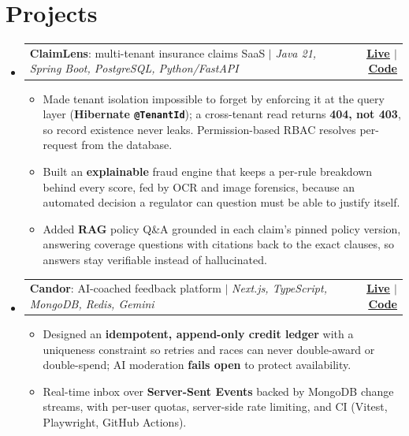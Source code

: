 \documentclass[letterpaper,11pt]{article}
\makeatletter
\newcommand{\resumeItem}[1]{
  \item\small{
    {#1 \vspace{-2pt}}
  }
}
\newcommand{\resumeProjectHeading}[2]{
    \item
    \begin{tabular*}{1.001\textwidth}{l@{\extracolsep{\fill}}r}
      \small#1 & \textbf{\small #2}\\
    \end{tabular*}\vspace{-7pt}
}
\newcommand{\resumeSubHeadingListStart}{\begin{itemize}[leftmargin=0.0in, label={}]}
\newcommand{\resumeSubHeadingListEnd}{\end{itemize}}
\newcommand{\resumeItemListStart}{\begin{itemize}}
\newcommand{\resumeItemListEnd}{\end{itemize}\vspace{-5pt}}
\makeatother
\begin{document}
\section{Projects}
    \vspace{-5pt}
    \resumeSubHeadingListStart
      \resumeProjectHeading
          {\textbf{ClaimLens}: multi-tenant insurance claims SaaS $|$ \emph{Java 21, Spring Boot, PostgreSQL, Python/FastAPI}}{\href{https://claimlens-ten.vercel.app}{\underline{Live}} $|$ \href{https://github.com/Yogesh0627/Claim-Lens}{\underline{Code}}}
          \resumeItemListStart
            \resumeItem{Made tenant isolation impossible to forget by enforcing it at the query layer (\textbf{Hibernate \texttt{@TenantId}}); a cross-tenant read returns \textbf{404, not 403}, so record existence never leaks. Permission-based RBAC resolves per-request from the database.}
            \resumeItem{Built an \textbf{explainable} fraud engine that keeps a per-rule breakdown behind every score, fed by OCR and image forensics, because an automated decision a regulator can question must be able to justify itself.}
            \resumeItem{Added \textbf{RAG} policy Q\&A grounded in each claim's pinned policy version, answering coverage questions with citations back to the exact clauses, so answers stay verifiable instead of hallucinated.}
          \resumeItemListEnd
          \vspace{-13pt}
      \resumeProjectHeading
          {\textbf{Candor}: AI-coached feedback platform $|$ \emph{Next.js, TypeScript, MongoDB, Redis, Gemini}}{\href{https://candor-cyan.vercel.app}{\underline{Live}} $|$ \href{https://github.com/Yogesh0627/anonymous-message-app}{\underline{Code}}}
          \resumeItemListStart
            \resumeItem{Designed an \textbf{idempotent, append-only credit ledger} with a uniqueness constraint so retries and races can never double-award or double-spend; AI moderation \textbf{fails open} to protect availability.}
            \resumeItem{Real-time inbox over \textbf{Server-Sent Events} backed by MongoDB change streams, with per-user quotas, server-side rate limiting, and CI (Vitest, Playwright, GitHub Actions).}
          \resumeItemListEnd
    \resumeSubHeadingListEnd
\vspace{-9pt}

\end{document}
